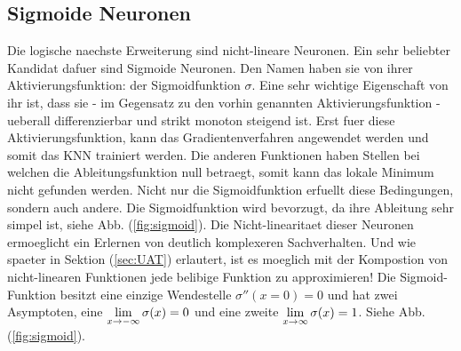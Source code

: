 \subsection{Sigmoide Neuronen}
Die logische naechste Erweiterung sind nicht-lineare Neuronen.
Ein sehr beliebter Kandidat dafuer sind Sigmoide Neuronen.
Den Namen haben sie von ihrer Aktivierungsfunktion: der Sigmoidfunktion $\sigma$.
Eine sehr wichtige Eigenschaft von ihr ist, dass sie - im Gegensatz zu den vorhin
genannten Aktivierungsfunktion - ueberall differenzierbar und strikt monoton
steigend ist. Erst fuer diese Aktivierungsfunktion, kann das Gradientenverfahren
angewendet werden und somit das KNN trainiert werden. Die anderen
Funktionen haben Stellen bei welchen die Ableitungsfunktion null
betraegt, somit kann das lokale Minimum nicht gefunden werden.
Nicht nur die Sigmoidfunktion erfuellt diese Bedingungen, sondern auch andere. Die Sigmoidfunktion wird
bevorzugt, da ihre Ableitung sehr simpel ist, siehe Abb. (\ref{fig:sigmoid}).
Die Nicht-linearitaet dieser Neuronen ermoeglicht ein Erlernen von deutlich komplexeren Sachverhalten.
Und wie spaeter in Sektion (\ref{sec:UAT}) erlautert, ist es moeglich mit der Kompostion von nicht-linearen
Funktionen jede belibige Funktion zu approximieren!
\para{}
Die Sigmoid-Funktion besitzt eine einzige Wendestelle $\sigma''(x=0)=0$ und hat
zwei Asymptoten, eine $\displaystyle\lim_{x \to -\infty} \sigma(x)=0$
und eine zweite $\displaystyle\lim_{x \to \infty} \sigma(x)=1$. Siehe Abb. (\ref{fig:sigmoid}).


